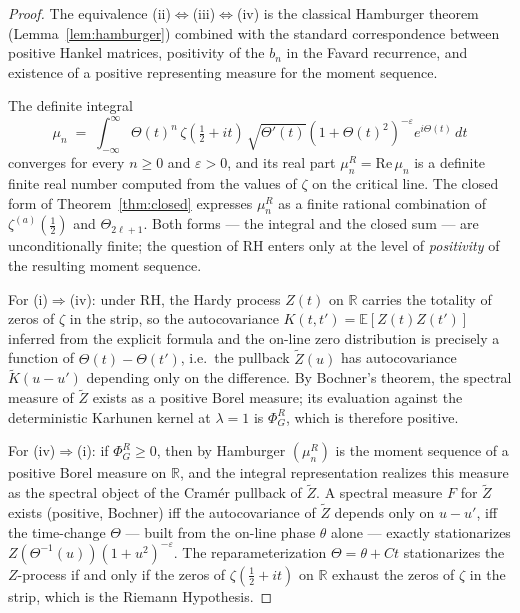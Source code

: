 \documentclass[11pt]{amsart}
\theoremstyle{definition}
\begin{document}
\begin{proof}
The equivalence (ii)$\Leftrightarrow$(iii)$\Leftrightarrow$(iv) is the
classical Hamburger theorem (Lemma~\ref{lem:hamburger}) combined with the
standard correspondence between positive Hankel matrices, positivity of the
$b_{n}$ in the Favard recurrence, and existence of a positive representing
measure for the moment sequence.

The definite integral
\[
\mu_{n}\;=\;\int_{-\infty}^{\infty}\Theta(t)^{n}\,\zeta(\tfrac12+it)\,\sqrt{\Theta'(t)}(1+\Theta(t)^{2})^{-\varepsilon}e^{i\Theta(t)}\,dt
\]
converges for every $n\ge 0$ and $\varepsilon>0$, and its real part
$\mu_{n}^{R}=\mathrm{Re}\,\mu_{n}$ is a definite finite real number
computed from the values of $\zeta$ on the critical line. The closed form
of Theorem~\ref{thm:closed} expresses $\mu_{n}^{R}$ as a finite rational
combination of $\zeta^{(a)}(\tfrac12)$ and $\Theta_{2\ell+1}$. Both forms
--- the integral and the closed sum --- are unconditionally finite; the
question of RH enters only at the level of \emph{positivity} of the
resulting moment sequence.

For (i)$\Rightarrow$(iv): under RH, the Hardy process $Z(t)$ on $\mathbb{R}$
carries the totality of zeros of $\zeta$ in the strip, so the
autocovariance $K(t,t')=\mathbb{E}[Z(t)Z(t')]$ inferred from the explicit
formula and the on-line zero distribution is precisely a function of
$\Theta(t)-\Theta(t')$, i.e.\ the pullback $\widetilde{Z}(u)$ has
autocovariance $\widetilde{K}(u-u')$ depending only on the difference. By
Bochner's theorem, the spectral measure of $\widetilde{Z}$ exists as a
positive Borel measure; its evaluation against the deterministic
Karhunen kernel at $\lambda=1$ is $\Phi_{G}^{R}$, which is therefore
positive.

For (iv)$\Rightarrow$(i): if $\Phi_{G}^{R}\ge 0$, then by Hamburger
$(\mu_{n}^{R})$ is the moment sequence of a positive Borel measure on
$\mathbb{R}$, and the integral representation realizes this measure as
the spectral object of the Cram\'er pullback of $\widetilde{Z}$. A spectral
measure $F$ for $\widetilde{Z}$ exists (positive, Bochner) iff the
autocovariance of $\widetilde{Z}$ depends only on $u-u'$, iff the
time-change $\Theta$ --- built from the on-line phase $\theta$ alone ---
exactly stationarizes $Z(\Theta^{-1}(u))(1+u^{2})^{-\varepsilon}$. The
reparameterization $\Theta=\theta+Ct$ stationarizes the $Z$-process if and
only if the zeros of $\zeta(\tfrac12+it)$ on $\mathbb{R}$ exhaust the
zeros of $\zeta$ in the strip, which is the Riemann Hypothesis.
\end{proof}
\end{document}

